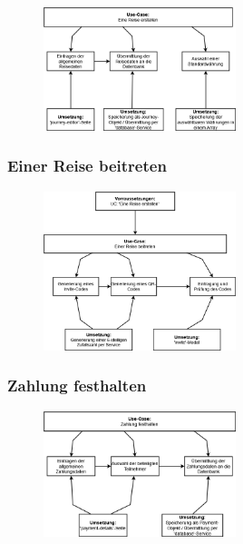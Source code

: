 	\begin{figure}[H]
		\centering
		\includegraphics[width=0.5\textwidth]{img/diagrams/Anforderung-Reise_erstellen}
	\end{figure}

\subsubsection{Einer Reise beitreten}

	\begin{figure}[H]
		\centering
		\includegraphics[width=0.5\textwidth]{img/diagrams/Anforderung-Reise_beitreten}
	\end{figure}

\subsubsection{Zahlung festhalten}

	\begin{figure}[H]
		\centering
		\includegraphics[width=0.5\textwidth]{img/diagrams/Anforderung-Zahlung_festhalten}
	\end{figure}

